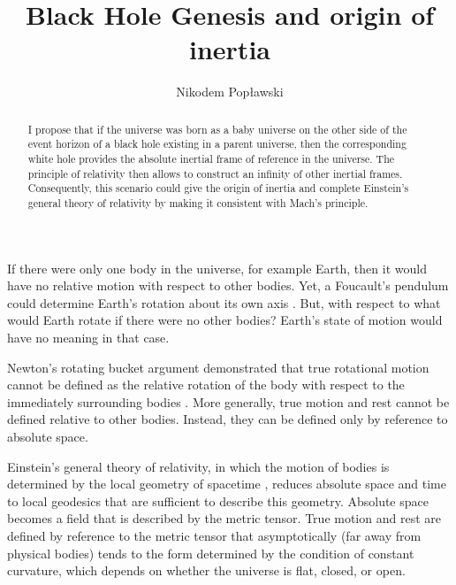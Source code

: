 \documentclass[prl,twocolumn,nofootinbib]{revtex4}
\begin{document}
\title{Black Hole Genesis and origin of inertia}

\author{Nikodem Pop{\l}awski}



\begin{abstract}
I propose that if the universe was born as a baby universe on the other side of the event horizon of a black hole existing in a parent universe, then the corresponding white hole provides the absolute inertial frame of reference in the universe.
The principle of relativity then allows to construct an infinity of other inertial frames.
Consequently, this scenario could give the origin of inertia and complete Einstein's general theory of relativity by making it consistent with Mach's principle.
\end{abstract}
\maketitle


If there were only one body in the universe, for example Earth, then it would have no relative motion with respect to other bodies.
Yet, a Foucault's pendulum could determine Earth's rotation about its own axis \cite{LL1}.
But, with respect to what would Earth rotate if there were no other bodies?
Earth's state of motion would have no meaning in that case.

Newton's rotating bucket argument demonstrated that true rotational motion cannot be defined as the relative rotation of the body with respect to the immediately surrounding bodies \cite{Newton}.
More generally, true motion and rest cannot be defined relative to other bodies. Instead, they can be defined only by reference to absolute space.

Einstein's general theory of relativity, in which the motion of bodies is determined by the local geometry of spacetime \cite{LL2}, reduces absolute space and time to local geodesics that are sufficient to describe this geometry.
Absolute space becomes a field that is described by the metric tensor.
True motion and rest are defined by reference to the metric tensor that asymptotically (far away from physical bodies) tends to the form determined by the condition of constant curvature, which depends on whether the universe is flat, closed, or open.
\end{document}
